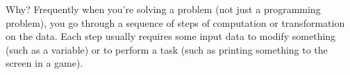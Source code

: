 
Why? Frequently when you're solving a problem (not just a programming problem), you go through a sequence of steps of computation or transformation on the data. Each step usually requires some input data to modify something (such as a variable) or to perform a task (such as printing something to the screen in a game).

